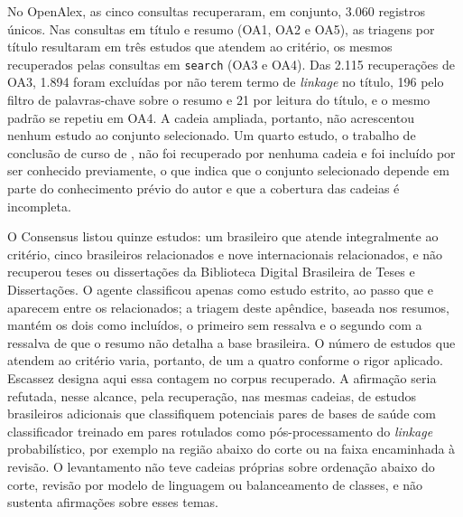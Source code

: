 No OpenAlex, as cinco consultas recuperaram, em conjunto, 3.060 registros únicos. Nas consultas em título e resumo (OA1, OA2 e OA5), as triagens por título resultaram em três estudos que atendem ao critério, os mesmos recuperados pelas consultas em \texttt{search} (OA3 e OA4). Das 2.115 recuperações de OA3, 1.894 foram excluídas por não terem termo de \textit{linkage} no título, 196 pelo filtro de palavras-chave sobre o resumo e 21 por leitura do título, e o mesmo padrão se repetiu em OA4. A cadeia ampliada, portanto, não acrescentou nenhum estudo ao conjunto selecionado. Um quarto estudo, o trabalho de conclusão de curso de , não foi recuperado por nenhuma cadeia e foi incluído por ser conhecido previamente, o que indica que o conjunto selecionado depende em parte do conhecimento prévio do autor e que a cobertura das cadeias é incompleta.

O Consensus listou quinze estudos: um brasileiro que atende integralmente ao critério, cinco brasileiros relacionados e nove internacionais relacionados, e não recuperou teses ou dissertações da Biblioteca Digital Brasileira de Teses e Dissertações. O agente classificou apenas  como estudo estrito, ao passo que  e  aparecem entre os relacionados; a triagem deste apêndice, baseada nos resumos, mantém os dois como incluídos, o primeiro sem ressalva e o segundo com a ressalva de que o resumo não detalha a base brasileira. O número de estudos que atendem ao critério varia, portanto, de um a quatro conforme o rigor aplicado. Escassez designa aqui essa contagem no corpus recuperado. A afirmação seria refutada, nesse alcance, pela recuperação, nas mesmas cadeias, de estudos brasileiros adicionais que classifiquem potenciais pares de bases de saúde com classificador treinado em pares rotulados como pós-processamento do \textit{linkage} probabilístico, por exemplo na região abaixo do corte ou na faixa encaminhada à revisão. O levantamento não teve cadeias próprias sobre ordenação abaixo do corte, revisão por modelo de linguagem ou balanceamento de classes, e não sustenta afirmações sobre esses temas.

